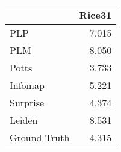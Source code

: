\begin{tabular}{lr}
\toprule
{} & Rice31 \\
\midrule
PLP          &  7.015 \\
PLM          &  8.050 \\
Potts        &  3.733 \\
Infomap      &  5.221 \\
Surprise     &  4.374 \\
Leiden       &  8.531 \\
Ground Truth &  4.315 \\
\bottomrule
\end{tabular}
